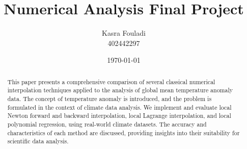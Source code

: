 \documentclass{article}
\title{Numerical Analysis Final Project}
\author{Kasra Fouladi \\ 402442297}
\date{\today}
\begin{document}
\maketitle

\small

\begin{abstract}
This paper presents a comprehensive comparison of several classical numerical interpolation
techniques applied to the analysis of global mean temperature anomaly data. The concept of temperature
anomaly is introduced, and the problem is formulated in the context of climate data analysis.
We implement and evaluate local Newton forward and backward interpolation, local Lagrange
interpolation, and local polynomial regression, using real-world climate datasets.
The accuracy and characteristics of each method are discussed, providing insights
into their suitability for scientific data analysis.
\end{abstract}









\end{document}
